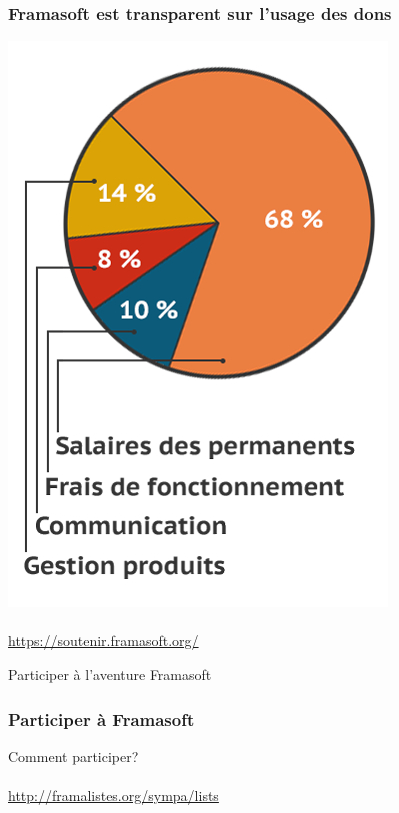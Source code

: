 \documentclass{beamer}
\begin{document}
\begin{frame}
\frametitle{Framasoft est transparent sur l'usage des dons}

\begin{center}
\includegraphics[scale=0.3]{./images/graphique.jpg}
\\~\\
\url{https://soutenir.framasoft.org/}
\end{center}
\end{frame}


\begin{frame}
\Huge{\centerline{Participer à l'aventure Framasoft}}
\end{frame}

\begin{frame}
\frametitle{Participer à Framasoft}

\begin{block}{Comment participer?}
\\~\\
\url{http://framalistes.org/sympa/lists}
\end{block}
\end{frame}
\end{document}
